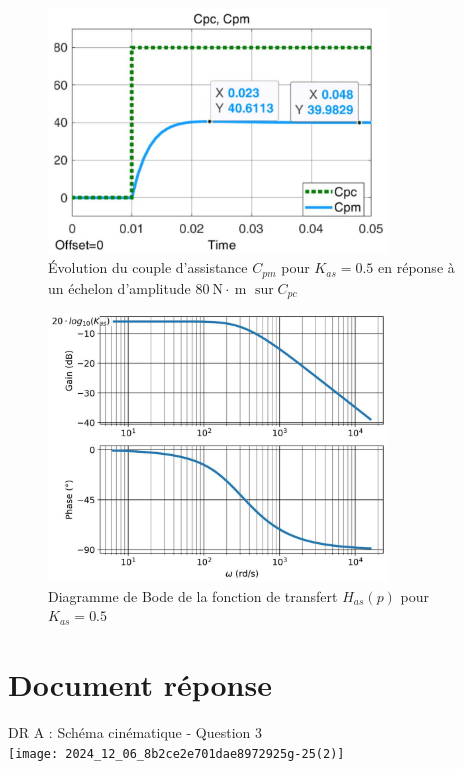 {{%
\begin{figure}[!htb]
\begin{center}
\includegraphics[width=0.8\textwidth]{images/2024_12_06_8b2ce2e701dae8972925g-24}
\caption{Évolution du couple d'assistance \(C_{p m}\) pour \(K_{a s}=0.5\) en réponse à un échelon d'amplitude \(80 \mathrm{~N} \cdot \mathrm{~m}\) \(\operatorname{sur} C_{p c}\)\\ \label{fig19}}
\end{center}
\end{figure}

\begin{figure}[!htb]
\begin{center}
\includegraphics[width=0.8\textwidth]{images/2024_12_06_8b2ce2e701dae8972925g-24(1)}
\caption{Diagramme de Bode de la fonction de transfert \(H_{a s}(p)\) pour \(K_{a s}=0.5\) \label{fig20}}
\end{center}
\end{figure}

\section*{Document réponse}
DR A : Schéma cinématique - Question 3\\
\texttt{[image: 2024\_12\_06\_8b2ce2e701dae8972925g-25(2)]}

}}
